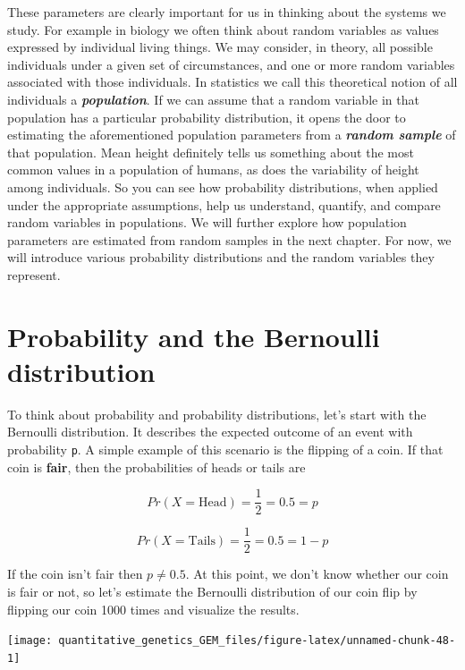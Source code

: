 \documentclass[
]{book}
\begin{document}
These parameters are clearly important for us in thinking about the systems we study. For example in biology we often think about random variables as values expressed by individual living things. We may consider, in theory, all possible individuals under a given set of circumstances, and one or more random variables associated with those individuals. In statistics we call this theoretical notion of all individuals a \textbf{\emph{population}}. If we can assume that a random variable in that population has a particular probability distribution, it opens the door to estimating the aforementioned population parameters from a \textbf{\emph{random sample}} of that population. Mean height definitely tells us something about the most common values in a population of humans, as does the variability of height among individuals. So you can see how probability distributions, when applied under the appropriate assumptions, help us understand, quantify, and compare random variables in populations. We will further explore how population parameters are estimated from random samples in the next chapter. For now, we will introduce various probability distributions and the random variables they represent.

\hypertarget{probability-and-the-bernoulli-distribution}{%
\section{Probability and the Bernoulli distribution}\label{probability-and-the-bernoulli-distribution}}

To think about probability and probability distributions, let's start with the Bernoulli distribution. It describes the expected outcome of an event with probability \texttt{p}. A simple example of this scenario is the flipping of a coin. If that coin is \textbf{fair}, then the probabilities of heads or tails are

\[Pr(X=\text{Head}) = \frac{1}{2} = 0.5 = p \]

\[Pr(X=\text{Tails}) = \frac{1}{2} = 0.5 = 1 - p \]

If the coin isn't fair then \(p \neq 0.5\). At this point, we don't know whether our coin is fair or not, so let's estimate the Bernoulli distribution of our coin flip by flipping our coin 1000 times and visualize the results.

\begin{center}\texttt{[image: quantitative\_genetics\_GEM\_files/figure-latex/unnamed-chunk-48-1]} \end{center}
\end{document}
